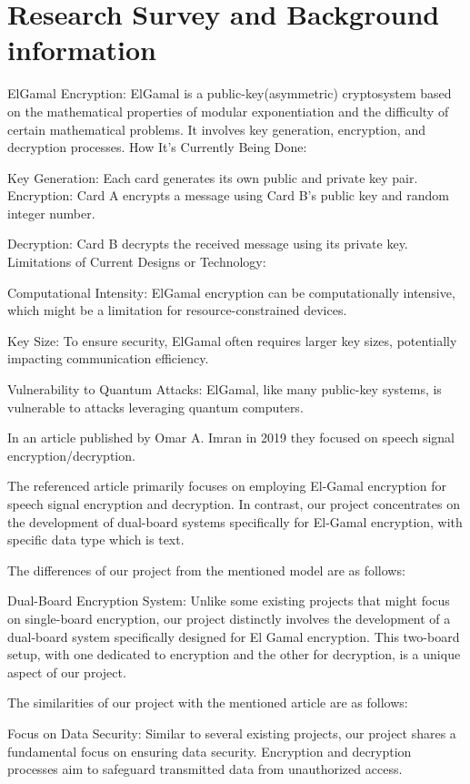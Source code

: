 \documentclass[12pt]{article}
\begin{document}
	\section{Research Survey and Background information}
		
		ElGamal Encryption: ElGamal is a public-key(asymmetric) cryptosystem based on the mathematical properties of modular exponentiation and the difficulty of certain mathematical problems. It involves key generation, encryption, and decryption processes.
		How It's Currently Being Done:
		
		Key Generation: Each card generates its own public and private key pair.
		Encryption: Card A encrypts a message using Card B's public key and random integer number.
		
		Decryption: Card B decrypts the received message using its private key.
		Limitations of Current Designs or Technology:
		
		Computational Intensity: ElGamal encryption can be computationally intensive, which might be a limitation for resource-constrained devices.
		
		Key Size: To ensure security, ElGamal often requires larger key sizes, potentially impacting communication efficiency.
		
		Vulnerability to Quantum Attacks: ElGamal, like many public-key systems, is vulnerable to attacks leveraging quantum computers.
		
		
		In an article published by Omar A. Imran in 2019 they focused on speech signal encryption/decryption.
		
		 The referenced article primarily focuses on employing El-Gamal encryption for speech signal encryption and decryption. In contrast, our project concentrates on the development of dual-board systems specifically for El-Gamal encryption, with specific data type which is text.
	 
		The differences of our project from the mentioned model are as follows:
		
		Dual-Board Encryption System: Unlike some existing projects that might focus on single-board encryption, our project distinctly involves the development of a dual-board system specifically designed for El Gamal encryption. This two-board setup, with one dedicated to encryption and the other for decryption, is a unique aspect of our project.
		
		
		The similarities of our project with the mentioned article are as follows:
		
		Focus on Data Security: Similar to several existing projects, our project shares a fundamental focus on ensuring data security. Encryption and decryption processes aim to safeguard transmitted data from unauthorized access.
			
\end{document}
